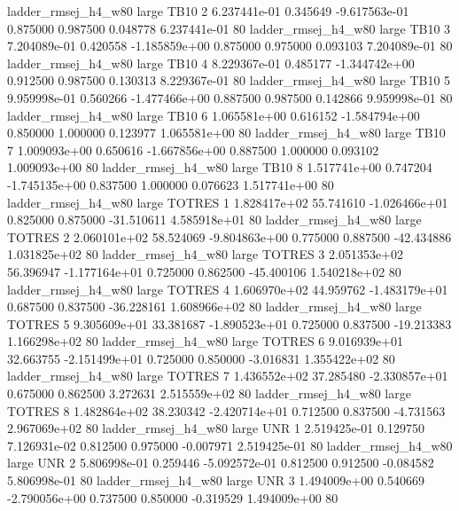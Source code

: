 ladder_rmsej_h4_w80      large     TB10                 2 6.237441e-01      0.345649 -9.617563e-01 0.875000 0.987500       0.048778 6.237441e-01 80
ladder_rmsej_h4_w80      large     TB10                 3 7.204089e-01      0.420558 -1.185859e+00 0.875000 0.975000       0.093103 7.204089e-01 80
ladder_rmsej_h4_w80      large     TB10                 4 8.229367e-01      0.485177 -1.344742e+00 0.912500 0.987500       0.130313 8.229367e-01 80
ladder_rmsej_h4_w80      large     TB10                 5 9.959998e-01      0.560266 -1.477466e+00 0.887500 0.987500       0.142866 9.959998e-01 80
ladder_rmsej_h4_w80      large     TB10                 6 1.065581e+00      0.616152 -1.584794e+00 0.850000 1.000000       0.123977 1.065581e+00 80
ladder_rmsej_h4_w80      large     TB10                 7 1.009093e+00      0.650616 -1.667856e+00 0.887500 1.000000       0.093102 1.009093e+00 80
ladder_rmsej_h4_w80      large     TB10                 8 1.517741e+00      0.747204 -1.745135e+00 0.837500 1.000000       0.076623 1.517741e+00 80
ladder_rmsej_h4_w80      large   TOTRES                 1 1.828417e+02     55.741610 -1.026466e+01 0.825000 0.875000     -31.510611 4.585918e+01 80
ladder_rmsej_h4_w80      large   TOTRES                 2 2.060101e+02     58.524069 -9.804863e+00 0.775000 0.887500     -42.434886 1.031825e+02 80
ladder_rmsej_h4_w80      large   TOTRES                 3 2.051353e+02     56.396947 -1.177164e+01 0.725000 0.862500     -45.400106 1.540218e+02 80
ladder_rmsej_h4_w80      large   TOTRES                 4 1.606970e+02     44.959762 -1.483179e+01 0.687500 0.837500     -36.228161 1.608966e+02 80
ladder_rmsej_h4_w80      large   TOTRES                 5 9.305609e+01     33.381687 -1.890523e+01 0.725000 0.837500     -19.213383 1.166298e+02 80
ladder_rmsej_h4_w80      large   TOTRES                 6 9.016939e+01     32.663755 -2.151499e+01 0.725000 0.850000      -3.016831 1.355422e+02 80
ladder_rmsej_h4_w80      large   TOTRES                 7 1.436552e+02     37.285480 -2.330857e+01 0.675000 0.862500       3.272631 2.515559e+02 80
ladder_rmsej_h4_w80      large   TOTRES                 8 1.482864e+02     38.230342 -2.420714e+01 0.712500 0.837500      -4.731563 2.967069e+02 80
ladder_rmsej_h4_w80      large      UNR                 1 2.519425e-01      0.129750  7.126931e-02 0.812500 0.975000      -0.007971 2.519425e-01 80
ladder_rmsej_h4_w80      large      UNR                 2 5.806998e-01      0.259446 -5.092572e-01 0.812500 0.912500      -0.084582 5.806998e-01 80
ladder_rmsej_h4_w80      large      UNR                 3 1.494009e+00      0.540669 -2.790056e+00 0.737500 0.850000      -0.319529 1.494009e+00 80
